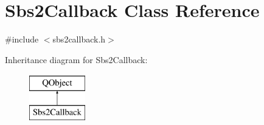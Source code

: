 \hypertarget{classSbs2Callback}{\section{Sbs2\-Callback Class Reference}
\label{classSbs2Callback}
}


{\ttfamily \#include $<$sbs2callback.\-h$>$}

Inheritance diagram for Sbs2\-Callback\-:\begin{figure}[H]
\begin{center}
\leavevmode
\includegraphics[height=2.000000cm]{classSbs2Callback}
\end{center}
\end{figure}
